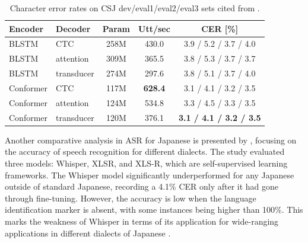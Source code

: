 \begin{table}[h!]
    \centering
    \caption{Character error rates on CSJ dev/eval1/eval2/eval3 sets cited from \cite{Karita2021}.}
    \begin{tabular}{l|l|c|c|c}
    \hline
    \textbf{Encoder}   & \textbf{Decoder}   & \textbf{Param} & \textbf{Utt/sec} & \textbf{CER [\%]} \\ \hline
    BLSTM              & CTC               & 258M             & 430.0            & 3.9 / 5.2 / 3.7 / 4.0 \\
    BLSTM              & attention         & 309M             & 365.5            & 3.8 / 5.3 / 3.7 / 3.7 \\
    BLSTM              & transducer        & 274M             & 297.6            & 3.8 / 5.1 / 3.7 / 4.0 \\
    Conformer          & CTC               & 117M             & \textbf{628.4}   & 3.1 / 4.1 / 3.2 / 3.5 \\
    Conformer          & attention         & 124M             & 534.8            & 3.3 / 4.5 / 3.3 / 3.5 \\
    Conformer          & transducer        & 120M             & 376.1            & \textbf{3.1 / 4.1 / 3.2 / 3.5} \\ \hline
    \end{tabular}
    \label{tab:cer_comparison}
\end{table}

Another comparative analysis in ASR for Japanese is presented by \textcite{takahashi2024comparison}, focusing on the accuracy of speech recognition for different dialects. The study evaluated three models: Whisper, XLSR, and XLS-R, which are self-supervised learning frameworks. The Whisper model significantly underperformed for any Japanese outside of standard Japanese, recording a 4.1\% CER only after it had gone through fine-tuning. However, the accuracy is low when the language identification marker is absent, with some instances being higher than 100\%. This marks the weakness of Whisper in terms of its application for wide-ranging applications in different dialects of Japanese \parencite{takahashi2024comparison}.

